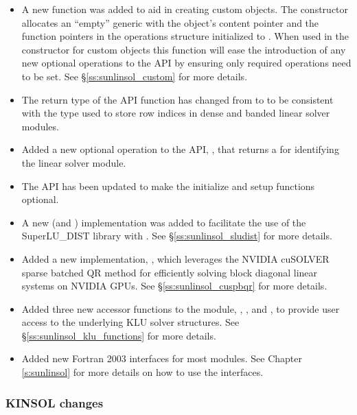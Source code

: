 \begin{itemize}
\item A new function was added to aid in creating custom {\sunlinsol} objects.
The constructor  allocates an ``empty'' generic
{\sunlinsol} with the object's content pointer and the function pointers
in the operations structure initialized to . When used in the
constructor for custom objects this function will ease the introduction of any
new optional operations to the {\sunlinsol} API by ensuring only required
operations need to be set. See \S\ref{ss:sunlinsol_custom} for more details.
%
\item The return type of the {\sunlinsol} API function 
has changed from  to  to be consistent with the
type used to store row indices in dense and banded linear solver modules.
%
\item Added a new optional operation to the {\sunlinsol} API,
, that returns a \newline\noindent
{} for identifying the
linear solver module.
%
\item The {\sunlinsol} API has been updated to make the initialize and setup
functions optional.
%
\item A new {\sunlinsol} (and {\sunmatrix}) implementation was added to
facilitate the use of the SuperLU\_DIST library with {\sundials}. See
\S\ref{ss:sunlinsol_sludist} for more details.
%
\item Added a new {\sunlinsol} implementation,
, which leverages the NVIDIA cuSOLVER
sparse batched QR method for efficiently solving block diagonal linear systems
on NVIDIA GPUs. See \S\ref{ss:sunlinsol_cuspbqr} for more details.
%
\item Added three new accessor functions to the {\sunlinsolklu} module,
,
, and
,
to provide user access to the underlying KLU solver structures. See
\S\ref{ss:sunlinsol_klu_functions} for more details.
%
\item Added new Fortran 2003 interfaces for most {\sunlinsol} modules. See
Chapter \ref{s:sunlinsol} for more details on how to use the interfaces.
\end{itemize}

\subsubsection*{KINSOL changes}

